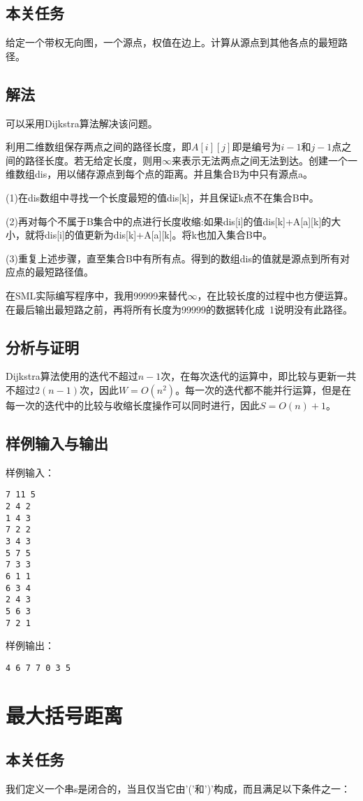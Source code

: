\documentclass[UTF8,a4paperdui, %
]{ctexart}
\begin{document}
\subsection{本关任务}
给定一个带权无向图，一个源点，权值在边上。计算从源点到其他各点的最短路径。
\subsection{解法}
可以采用Dijkstra算法解决该问题。

利用二维数组保存两点之间的路径长度，即$A[i][j]$即是编号为$i-1$和$j-1$点之间的路径长度。若无给定长度，则用$\infty$来表示无法两点之间无法到达。创建一个一维数组dis，用以储存源点到每个点的距离。并且集合B为中只有源点a。

(1)在dis数组中寻找一个长度最短的值dis[k]，并且保证k点不在集合B中。

(2)再对每个不属于B集合中的点进行长度收缩:如果dis[i]的值dis[k]+A[a][k]的大小，就将dis[i]的值更新为dis[k]+A[a][k]。将k也加入集合B中。

(3)重复上述步骤，直至集合B中有所有点。得到的数组dis的值就是源点到所有对应点的最短路径值。

在SML实际编写程序中，我用99999来替代$\infty$，在比较长度的过程中也方便运算。在最后输出最短路之前，再将所有长度为99999的数据转化成~1说明没有此路径。
\subsection{分析与证明}
Dijkstra算法使用的迭代不超过$n-1$次，在每次迭代的运算中，即比较与更新一共不超过$2(n-1)$次，因此$W=O(n^2)$。每一次的迭代都不能并行运算，但是在每一次的迭代中的比较与收缩长度操作可以同时进行，因此$S=O(n)+1$。
\subsection{样例输入与输出}
样例输入：
\begin{lstlisting}
7 11 5
2 4 2
1 4 3
7 2 2
3 4 3
5 7 5
7 3 3
6 1 1
6 3 4
2 4 3
5 6 3
7 2 1
\end{lstlisting}
样例输出：
\begin{lstlisting}
4 6 7 7 0 3 5 
\end{lstlisting}

\section{最大括号距离}
\subsection{本关任务}
我们定义一个串s是闭合的，当且仅当它由'('和')'构成，而且满足以下条件之一：
\end{document}
